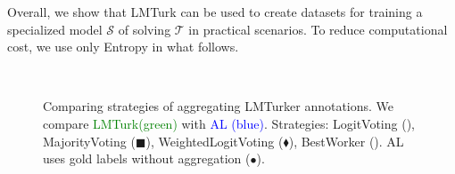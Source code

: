 \documentclass[11pt]{article}
\def\md{LMTurk\xspace}
\def\mdr{LMTurker\xspace}
\def\figlabel#1{\label{fig:#1}\label{p:#1}}
\begin{document}
Overall, we show that
\md can be used to create
datasets for training a specialized
model $\mathcal{S}$ of solving
$\mathcal{T}$ in practical scenarios.
To reduce computational cost, we use only
Entropy in what follows.


\begin{figure}[t]
\centering
{}
\vspace{-.2cm}
\\
\vspace{-.2cm}
\vspace{-.2cm}
\caption{
  Comparing 
  strategies of aggregating \mdr
  annotations.
  We compare \textcolor{green}{\md (green)} with
  \textcolor{blue}{AL (blue)}.
  Strategies: 
  LogitVoting (\tiny\XSolidBold\normalsize),
  MajorityVoting (\tiny$\blacksquare$\normalsize),
  WeightedLogitVoting (\scriptsize$\blacklozenge$\normalsize),
  BestWorker (\scriptsize{}\normalsize).  
  AL uses gold labels without aggregation ($\bullet$).
}
\figlabel{varyaggs}
\end{figure}
\end{document}
